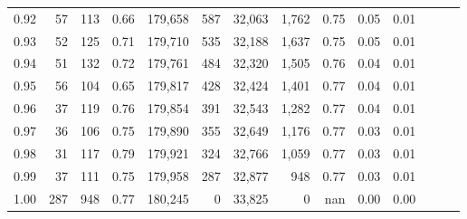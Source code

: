 \begin{tabular}{rrrrrrrrrrrrrr}
0.92 &     57 &  113 &  0.66 &  179,658 &      587 &  32,063 &   1,762 &  0.75 &  0.05 &      0.01 \\
0.93 &     52 &  125 &  0.71 &  179,710 &      535 &  32,188 &   1,637 &  0.75 &  0.05 &      0.01 \\
0.94 &     51 &  132 &  0.72 &  179,761 &      484 &  32,320 &   1,505 &  0.76 &  0.04 &      0.01 \\
0.95 &     56 &  104 &  0.65 &  179,817 &      428 &  32,424 &   1,401 &  0.77 &  0.04 &      0.01 \\
0.96 &     37 &  119 &  0.76 &  179,854 &      391 &  32,543 &   1,282 &  0.77 &  0.04 &      0.01 \\
0.97 &     36 &  106 &  0.75 &  179,890 &      355 &  32,649 &   1,176 &  0.77 &  0.03 &      0.01 \\
0.98 &     31 &  117 &  0.79 &  179,921 &      324 &  32,766 &   1,059 &  0.77 &  0.03 &      0.01 \\
0.99 &     37 &  111 &  0.75 &  179,958 &      287 &  32,877 &     948 &  0.77 &  0.03 &      0.01 \\
1.00 &    287 &  948 &  0.77 &  180,245 &        0 &  33,825 &       0 &   nan &  0.00 &      0.00 \\
\bottomrule
\end{tabular}
